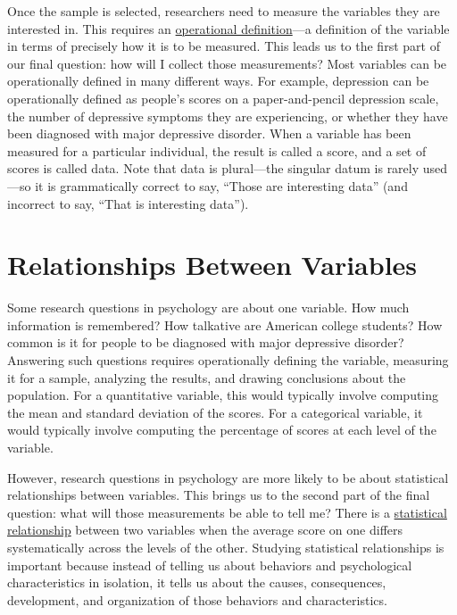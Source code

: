 \documentclass[
]{krantz}
\begin{document}
Once the sample is selected, researchers need to measure the variables they are interested in. This requires an \hyperref[operational-definition]{operational definition}---a definition of the variable in terms of precisely how it is to be measured. This leads us to the first part of our final question: how will I collect those measurements? Most variables can be operationally defined in many different ways. For example, depression can be operationally defined as people's scores on a paper-and-pencil depression scale, the number of depressive symptoms they are experiencing, or whether they have been diagnosed with major depressive disorder. When a variable has been measured for a particular individual, the result is called a score, and a set of scores is called data. Note that data is plural---the singular datum is rarely used---so it is grammatically correct to say, ``Those are interesting data'' (and incorrect to say, ``That is interesting data'').

\section{Relationships Between Variables}\label{relationships-between-variables}

Some research questions in psychology are about one variable. How much information is remembered? How talkative are American college students? How common is it for people to be diagnosed with major depressive disorder? Answering such questions requires operationally defining the variable, measuring it for a sample, analyzing the results, and drawing conclusions about the population. For a quantitative variable, this would typically involve computing the mean and standard deviation of the scores. For a categorical variable, it would typically involve computing the percentage of scores at each level of the variable.

However, research questions in psychology are more likely to be about statistical relationships between variables. This brings us to the second part of the final question: what will those measurements be able to tell me? There is a \hyperref[statistical-relationship]{statistical relationship} between two variables when the average score on one differs systematically across the levels of the other. Studying statistical relationships is important because instead of telling us about behaviors and psychological characteristics in isolation, it tells us about the causes, consequences, development, and organization of those behaviors and characteristics.
\end{document}
